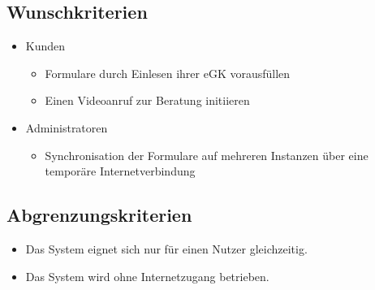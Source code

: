 \newpage

\subsection{Wunschkriterien}

\begin{itemize}
  \item Kunden
    \begin{itemize}
        \item Formulare durch Einlesen ihrer eGK vorausfüllen
        \item Einen Videoanruf zur Beratung initiieren
    \end{itemize}
    \item Administratoren
        \begin{itemize}
            \item Synchronisation der Formulare auf mehreren Instanzen über eine temporäre Internetverbindung
        \end{itemize}
\end{itemize}
\vspace{1,5cm}
\subsection{Abgrenzungskriterien}

\begin{itemize}
  \item Das System eignet sich nur für einen Nutzer gleichzeitig.
  \item Das System wird ohne Internetzugang betrieben.
\end{itemize}

